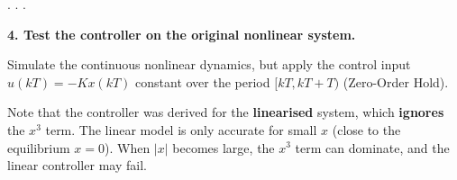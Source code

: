\documentclass[
  letterpaper,
  DIV=11,
  numbers=noendperiod,
  oneside]{scrartcl}
\begin{document}
. . .

\textbf{4. Test the controller on the original nonlinear system.}

Simulate the continuous nonlinear dynamics, but apply the control input
\(u(kT) = -K x(kT)\) constant over the period \([kT, kT + T)\)
(Zero-Order Hold).

\begin{tcolorbox}[enhanced jigsaw, rightrule=.15mm, coltitle=black, titlerule=0mm, breakable, title=\textcolor{quarto-callout-important-color}{\faExclamation}\hspace{0.5em}{Important}, bottomrule=.15mm, colback=white, toprule=.15mm, opacityback=0, opacitybacktitle=0.6, leftrule=.75mm, left=2mm, colbacktitle=quarto-callout-important-color!10!white, bottomtitle=1mm, toptitle=1mm, arc=.35mm, colframe=quarto-callout-important-color-frame]

Note that the controller was derived for the \textbf{linearised} system,
which \textbf{ignores} the \(x^3\) term. The linear model is only
accurate for small \(x\) (close to the equilibrium \(x=0\)). When
\(|x|\) becomes large, the \(x^3\) term can dominate, and the linear
controller may fail.

\end{tcolorbox}
\end{document}
